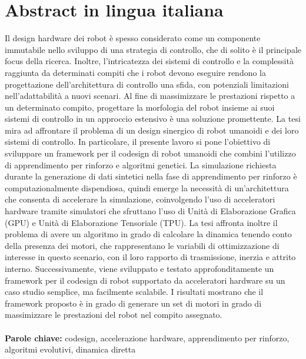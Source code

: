 \documentclass{Configuration_Files/PoliMi3i_thesis}
\begin{document}
\chapter*{Abstract in lingua italiana}
Il design hardware dei robot è spesso considerato come un componente immutabile nello sviluppo di una strategia di controllo, che di solito è il principale focus della ricerca. Inoltre, l'intricatezza dei sistemi di controllo e la complessità raggiunta da determinati compiti che i robot devono eseguire rendono la progettazione dell'architettura di controllo una sfida, con potenziali limitazioni nell'adattabilità a nuovi scenari. Al fine di massimizzare le prestazioni rispetto a un determinato compito, progettare la morfologia del robot insieme ai suoi sistemi di controllo in un approccio estensivo è una soluzione promettente. La tesi mira ad affrontare il problema di un design sinergico di robot umanoidi e dei loro sistemi di controllo. In particolare, il presente lavoro si pone l'obiettivo di sviluppare un framework per il codesign di robot umanoidi che combini l'utilizzo di apprendimento per rinforzo e algoritmi genetici. La simulazione richiesta durante la generazione di dati sintetici nella fase di apprendimento per rinforzo è computazionalmente dispendiosa, quindi emerge la necessità di un'architettura che consenta di accelerare la simulazione, coinvolgendo l'uso di acceleratori hardware tramite simulatori che sfruttano l'uso di Unità di Elaborazione Grafica (GPU) e Unità di Elaborazione Tensoriale (TPU). La tesi affronta inoltre il problema di avere un algoritmo in grado di calcolare la dinamica tenendo conto della presenza dei motori, che rappresentano le variabili di ottimizzazione di interesse in questo scenario, con il loro rapporto di trasmissione, inerzia e attrito interno. Successivamente, viene sviluppato e testato approfonditamente un framework per il codesign di robot supportato da acceleratori hardware su un caso studio semplice, ma facilmente scalabile. I risultati mostrano che il framework proposto è in grado di generare un set di motori in grado di massimizzare le prestazioni del robot nel compito assegnato.
\\
\\
\textbf{Parole chiave:} codesign, accelerazione hardware, apprendimento per rinforzo, algoritmi evolutivi, dinamica diretta %

\end{document}
